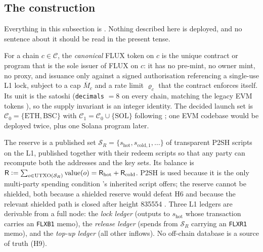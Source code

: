 \subsection{The construction}
\label{sec:bridging-construction}

Everything in this subsection is \planned. Nothing described here is deployed, and no sentence about
it should be read in the present tense.

\begin{definition}
\label{def:canonical}
For a chain $c \in \mathcal{C}$, the \emph{canonical} FLUX token on $c$ is the unique contract or
program that is the sole issuer of FLUX on $c$: it has no pre-mint, no owner mint, no proxy, and
issuance only against a signed authorisation referencing a single-use L1 lock, subject to a cap
$\overline{M}_c$ and a rate limit $\varrho_c$ that the contract enforces itself. Its unit is the satoshi
(\texttt{decimals} $=8$ on every chain, matching the legacy EVM tokens
), so the supply invariant is an integer identity. The decided
launch set is $\mathcal{C}_0 = \{\mathrm{ETH}, \mathrm{BSC}\}$ with
$\mathcal{C}_1 = \mathcal{C}_0 \cup \{\mathrm{SOL}\}$ following ;
one EVM codebase would be deployed twice, plus one Solana program later. \planned
\end{definition}

\begin{definition}[L1 reserve]
\label{def:reserve}
The reserve is a published set $\mathcal{S}_R = \{s_{\mathrm{hot}}, s_{\mathrm{cold},1}, \dots\}$ of
transparent P2SH scripts on the \Flux L1, published together with their redeem scripts so that any
party can recompute both the addresses and the key sets. Its balance is
$\mathsf{R} \vcentcolon= \sum_{o \in \mathrm{UTXO}(\mathcal{S}_R)} \mathrm{value}(o)
= \mathsf{R}_{\mathrm{hot}} + \mathsf{R}_{\mathrm{cold}}$. P2SH is used because it is the only
multi-party spending condition \Flux's inherited script offers; the reserve cannot be shielded, both
because a shielded reserve would defeat H6 and because the relevant shielded path is closed after
height \num{835554} . Three L1 ledgers are derivable from a
full node: the \emph{lock ledger} (outputs to $s_{\mathrm{hot}}$ whose transaction carries an
\texttt{FLXB1} memo), the \emph{release ledger} (spends from $\mathcal{S}_R$ carrying an
\texttt{FLXR1} memo), and the \emph{top-up ledger} (all other inflows). No off-chain database is a
source of truth (H9). \planned
\end{definition}

